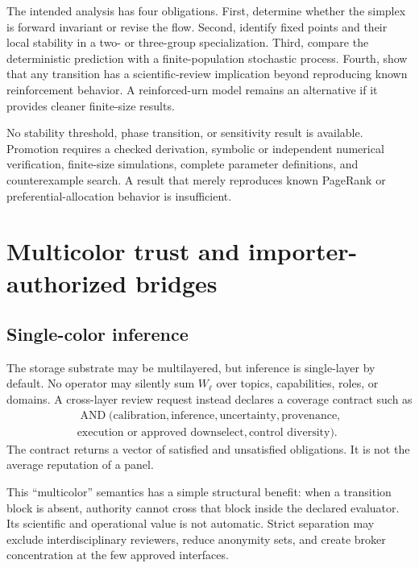 \documentclass[11pt]{article}
\begin{document}
The intended analysis has four obligations.  First, determine whether the simplex is forward invariant or revise the flow.  Second, identify fixed points and their local stability in a two- or three-group specialization.  Third, compare the deterministic prediction with a finite-population stochastic process.  Fourth, show that any transition has a scientific-review implication beyond reproducing known reinforcement behavior.  A reinforced-urn model remains an alternative if it provides cleaner finite-size results.

\begin{evidencegate}
No stability threshold, phase transition, or sensitivity result is available.  Promotion requires a checked derivation, symbolic or independent numerical verification, finite-size simulations, complete parameter definitions, and counterexample search.  A result that merely reproduces known PageRank or preferential-allocation behavior is insufficient.
\end{evidencegate}

\section{Multicolor trust and importer-authorized bridges}

\subsection{Single-color inference}

The storage substrate may be multilayered, but inference is single-layer by default.  No operator may silently sum $W_\ell$ over topics, capabilities, roles, or domains.  A cross-layer review request instead declares a coverage contract such as
\begin{multline}
 \operatorname{AND}(\text{calibration},\text{inference},\text{uncertainty},
 \text{provenance},\\
 \text{execution or approved downselect},\text{control diversity}).
\end{multline}
The contract returns a vector of satisfied and unsatisfied obligations.  It is not the average reputation of a panel.

This ``multicolor'' semantics has a simple structural benefit: when a transition block is absent, authority cannot cross that block inside the declared evaluator.  Its scientific and operational value is not automatic.  Strict separation may exclude interdisciplinary reviewers, reduce anonymity sets, and create broker concentration at the few approved interfaces.
\end{document}
